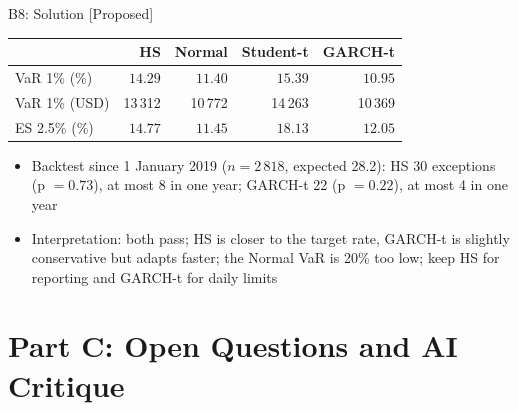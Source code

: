 \ifsolutions
\begin{frame}{B8: Solution [Proposed]}
\itemsize{\footnotesize}
\begin{center}
\scriptsize
\begin{tabular}{lrrrr}
\toprule
& HS & Normal & Student-t & GARCH-t \\
\midrule
VaR 1\% (\%) & $14.29$ & $11.40$ & $15.39$ & $10.95$ \\
VaR 1\% (USD) & 13\,312 & 10\,772 & 14\,263 & 10\,369 \\
ES 2.5\% (\%) & $14.77$ & $11.45$ & $18.13$ & $12.05$ \\
\bottomrule
\end{tabular}
\end{center}
\begin{itemize}
    \item Backtest since 1 January 2019 ($n = 2\,818$, expected 28.2): HS 30 exceptions (p $= 0.73$), at most 8 in one year; GARCH-t 22 (p $= 0.22$), at most 4 in one year
    \item Interpretation: both pass; HS is closer to the target rate, GARCH-t is slightly conservative but adapts faster; the Normal VaR is 20\% too low; keep HS for reporting and GARCH-t for daily limits
\end{itemize}
\end{frame}
\fi


\section{Part C: Open Questions and AI Critique}

